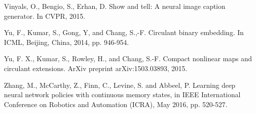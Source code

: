 \documentclass[a4paper,11pt]{article}
\begin{document}
\begin{thebibliography}{1}
 Vinyals, O., Bengio, S., Erhan, D. Show and tell: A neural image caption generator. In CVPR, 2015.




 Yu, F.,  Kumar, S., Gong, Y, and Chang, S.,-F.  Circulant binary embedding. In ICML, Beijing, China, 2014, pp. 946-954.

  Yu, F.  X.,  Kumar, S.,   Rowley, H.,  and  Chang, S.-F. Compact nonlinear maps and circulant extensions. ArXiv preprint arXiv:1503.03893, 2015.



 Zhang, M., McCarthy, Z., Finn, C., Levine, S. and Abbeel, P. Learning deep neural network policies with continuous memory states, in IEEE International Conference on Robotics and Automation (ICRA), May 2016, pp. 520-527.




\end{thebibliography}
\end{document}
